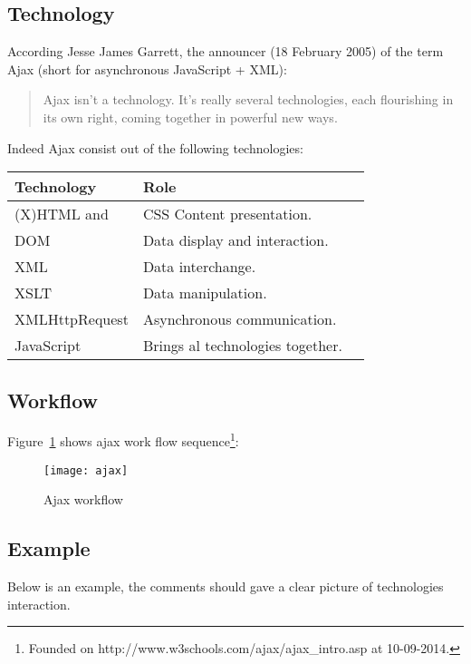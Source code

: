 \subsection{Technology}
According Jesse James Garrett, the announcer (18 February 2005) of the term Ajax (short for asynchronous JavaScript + XML):
\begin{quote}
Ajax isn’t a technology. It’s really several technologies, each flourishing in its own right, coming together in powerful new ways.\cite {jj05}
\end{quote}
Indeed Ajax consist out of the following technologies:
\begin{center}
    \begin{tabular}{l|l p{7cm}}
    \rowcolor{cyan}
    \textbf{Technology} & \textbf{Role} \\ \hline
    \rowcolor{cyan!50}
    (X)HTML and & CSS Content presentation. \\ 
    \rowcolor{cyan!10}
    DOM	& Data display and interaction. \\ 
    \rowcolor{cyan!50}
    XML	& Data interchange. \\ 
    \rowcolor{cyan!10}
    XSLT & Data manipulation. \\ 
    \rowcolor{cyan!50}
    XMLHttpRequest & Asynchronous communication. \\
    \rowcolor{cyan!10}
    JavaScript & Brings al technologies together. \\ 
    \end{tabular}
\end{center}

\subsection{Workflow}
Figure~\ref{fig:ajax} shows ajax work flow sequence\footnote{Founded on http://www.w3schools.com/ajax/ajax\_intro.asp at 10-09-2014.}: 
\begin{center}
	\begin{figure}[h!]
	  \centering
		\texttt{[image: ajax]}
	  \caption{Ajax workflow}
	  \label{fig:ajax}
	\end{figure}
\end{center}

\newpage

\subsection{Example}
Below is an example, the comments should gave a clear picture of technologies interaction\cite{w3s}.

